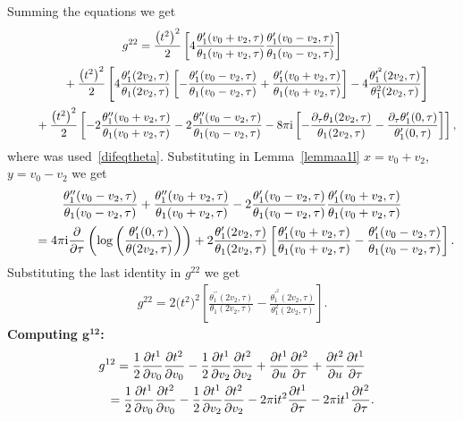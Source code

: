 \documentclass[pdftex]{sigma}%
\numberwithin{equation}{section}
\begin{document}
Summing the equations we get
\begin{gather*}
g^{22}=\frac{\big(t^2\big)^2}{2}\left[4\frac{\theta_1^{\prime}(v_0+v_2,\tau)}{\theta_1(v_0+v_2,\tau)} \frac{\theta_1^{\prime}(v_0-v_2,\tau)}{\theta_1(v_0-v_2,\tau)}\right]
\\[.3ex] \hphantom{g^{22}=}
{}+\frac{\big(t^2\big)^2}{2}\left[4\frac{\theta_1^{\prime}(2v_2,\tau)}{\theta_1(2v_2,\tau)} \left[-\frac{\theta_1^{\prime}(v_0-v_2,\tau)}{\theta_1(v_0-v_2,\tau)} +\frac{\theta_1^{\prime}(v_0+v_2,\tau)}{\theta_1(v_0+v_2,\tau)}\right] -4\frac{\theta_1^{\prime^2}(2v_2,\tau)}{\theta_1^2(2v_2,\tau)}\right]
\\[.3ex] \hphantom{g^{22}=}
{}+\frac{\big(t^2\big)^2}{2}\left[-2\frac{\theta_1^{\prime\prime}(v_0+v_2,\tau)}{\theta_1(v_0+v_2,\tau)} -2\frac{\theta_1^{\prime\prime}(v_0-v_2,\tau)}{\theta_1(v_0-v_2,\tau)}-8\pi {\rm i}\left[-\frac{\partial_{\tau}\theta_1(2v_2,\tau)}{\theta_1(2v_2,\tau)} -\frac{\partial_{\tau}\theta_1^{\prime}(0,\tau)}{\theta_1^{\prime}(0,\tau)}\right]\right],
\end{gather*}
where was used~\eqref{difeqtheta}. Substituting in Lemma~\ref{lemmaa1l} $x=v_0+v_2$, $y=v_0-v_2$ we get
\begin{gather*}
\frac{\theta_1^{\prime\prime}(v_0-v_2,\tau)}{\theta_1(v_0-v_2,\tau)} +\frac{\theta_1^{\prime\prime}(v_0+v_2,\tau)}{\theta_1(v_0+v_2,\tau)} -2\frac{\theta_1^{\prime}(v_0-v_2,\tau)}{\theta_1(v_0-v_2,\tau)} \frac{\theta_1^{\prime}(v_0+v_2,\tau)}{\theta_1(v_0+v_2,\tau)}
\\[.3ex] \qquad
{}=4\pi {\rm i} \frac{\partial}{\partial \tau}\left(\log\left(\frac{\theta_1^{\prime}(0,\tau)}{\theta(2v_2,\tau)}\right)\right) +2\frac{\theta_1^{\prime}(2v_2,\tau)}{\theta_1(2v_2,\tau)} \left[\frac{\theta_1^{\prime}(v_0+v_2,\tau)}{\theta_1
(v_0+v_2,\tau)}-\frac{\theta_1^{\prime}(v_0-v_2,\tau)}{\theta_1(v_0-v_2,\tau)}\right].
\end{gather*}
Substituting the last identity in $g^{22}$ we get
\begin{gather*}
g^{22}=2\big(t^2\big)^2\left[\frac{\theta_1^{\prime\prime}(2v_2,\tau)}{\theta_1(2v_2,\tau)} -\frac{\theta_1^{\prime^2}(2v_2,\tau)}{\theta_1^2(2v_2,\tau)}\right].
\end{gather*}
\textbf{Computing $\boldsymbol {g^{12}}$:}
\begin{gather*}
g^{12}=\frac{1}{2}\frac{\partial t^1}{\partial v_0}\frac{\partial t^2}{\partial v_0}-\frac{1}{2}\frac{\partial t^1}{\partial v_2}\frac{\partial t^2}{\partial v_2}+\frac{\partial t^1}{\partial u}\frac{\partial t^2}{\partial \tau}+\frac{\partial t^2}{\partial u}\frac{\partial t^1}{\partial \tau}
\\ \hphantom{g^{12}}
{}=\frac{1}{2}\frac{\partial t^1}{\partial v_0}\frac{\partial t^2}{\partial v_0}-\frac{1}{2}\frac{\partial t^1}{\partial v_2}\frac{\partial t^2}{\partial v_2}-2\pi {\rm i}t^2\frac{\partial t^1}{\partial \tau}-2\pi {\rm i}t^1\frac{\partial t^2}{\partial \tau}.
\end{gather*}
\end{document}
